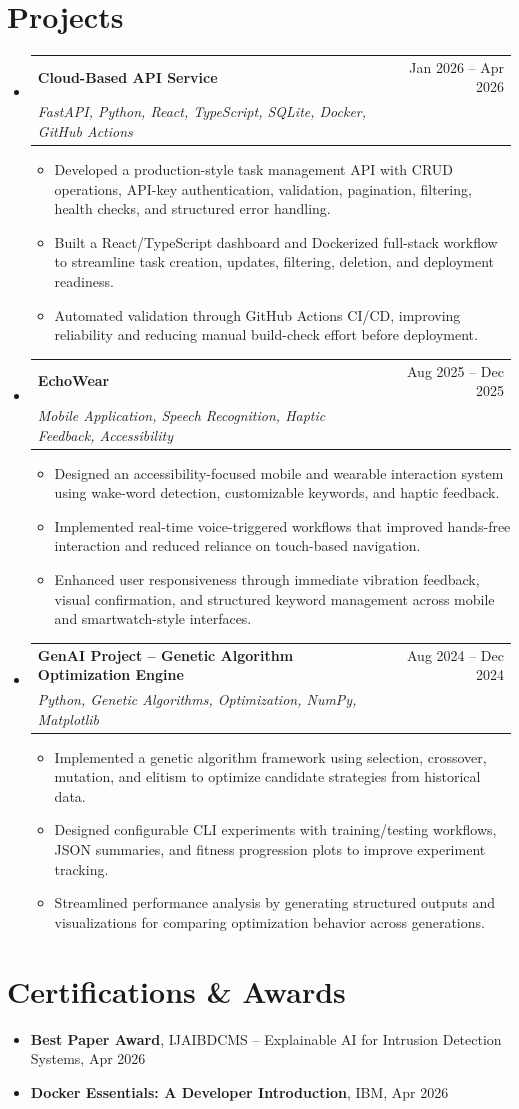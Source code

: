 \documentclass[letterpaper,10.5pt]{article}
\makeatletter
\newcommand{\resumeItem}[1]{\item #1}
\newcommand{\projectHeading}[3]{
  \item
  \begin{tabular*}{0.97\textwidth}{@{\extracolsep{\fill}} l r}
    \textbf{#1} & #2 \\
    \textit{#3} &
  \end{tabular*}
}
\makeatother
\begin{document}
\section{Projects}
\begin{itemize}

\projectHeading
  {Cloud-Based API Service}{Jan 2026 -- Apr 2026}
  {FastAPI, Python, React, TypeScript, SQLite, Docker, GitHub Actions}
\begin{itemize}
  \resumeItem{Developed a production-style task management API with CRUD operations, API-key authentication, validation, pagination, filtering, health checks, and structured error handling.}
  \resumeItem{Built a React/TypeScript dashboard and Dockerized full-stack workflow to streamline task creation, updates, filtering, deletion, and deployment readiness.}
  \resumeItem{Automated validation through GitHub Actions CI/CD, improving reliability and reducing manual build-check effort before deployment.}
\end{itemize}

\projectHeading
  {EchoWear}{Aug 2025 -- Dec 2025}
  {Mobile Application, Speech Recognition, Haptic Feedback, Accessibility}
\begin{itemize}
  \resumeItem{Designed an accessibility-focused mobile and wearable interaction system using wake-word detection, customizable keywords, and haptic feedback.}
  \resumeItem{Implemented real-time voice-triggered workflows that improved hands-free interaction and reduced reliance on touch-based navigation.}
  \resumeItem{Enhanced user responsiveness through immediate vibration feedback, visual confirmation, and structured keyword management across mobile and smartwatch-style interfaces.}
\end{itemize}

\projectHeading
  {GenAI Project -- Genetic Algorithm Optimization Engine}{Aug 2024 -- Dec 2024}
  {Python, Genetic Algorithms, Optimization, NumPy, Matplotlib}
\begin{itemize}
  \resumeItem{Implemented a genetic algorithm framework using selection, crossover, mutation, and elitism to optimize candidate strategies from historical data.}
  \resumeItem{Designed configurable CLI experiments with training/testing workflows, JSON summaries, and fitness progression plots to improve experiment tracking.}
  \resumeItem{Streamlined performance analysis by generating structured outputs and visualizations for comparing optimization behavior across generations.}
\end{itemize}

\end{itemize}

\section{Certifications \& Awards}
\begin{itemize}
  \resumeItem{\textbf{Best Paper Award}, IJAIBDCMS -- Explainable AI for Intrusion Detection Systems, Apr 2026}
  \resumeItem{\textbf{Docker Essentials: A Developer Introduction}, IBM, Apr 2026}
\end{itemize}
\end{document}
